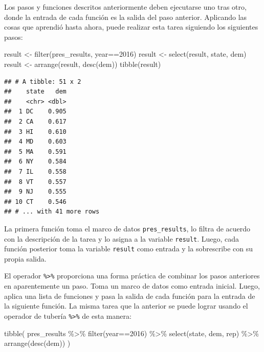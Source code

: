 \documentclass[
]{book}
\newenvironment{Shaded}{\begin{snugshade}}{\end{snugshade}}
\newcommand{\DecValTok}[1]{\textcolor[rgb]{0.00,0.00,0.81}{#1}}
\newcommand{\FunctionTok}[1]{\textcolor[rgb]{0.00,0.00,0.00}{#1}}
\newcommand{\NormalTok}[1]{#1}
\newcommand{\OtherTok}[1]{\textcolor[rgb]{0.56,0.35,0.01}{#1}}
\newcommand{\SpecialCharTok}[1]{\textcolor[rgb]{0.00,0.00,0.00}{#1}}
\begin{document}
Los pasos y funciones descritos anteriormente deben ejecutarse uno tras otro, donde la entrada de cada función es la salida del paso anterior. Aplicando las cosas que aprendió hasta ahora, puede realizar esta tarea siguiendo los siguientes pasos:

\begin{Shaded}
\begin{Highlighting}[]
\NormalTok{result }\OtherTok{\textless{}{-}} \FunctionTok{filter}\NormalTok{(pres\_results, year}\SpecialCharTok{==}\DecValTok{2016}\NormalTok{)}
\NormalTok{result }\OtherTok{\textless{}{-}} \FunctionTok{select}\NormalTok{(result, state, dem)}
\NormalTok{result }\OtherTok{\textless{}{-}} \FunctionTok{arrange}\NormalTok{(result, }\FunctionTok{desc}\NormalTok{(dem))}
\FunctionTok{tibble}\NormalTok{(result)}
\end{Highlighting}
\end{Shaded}

\begin{verbatim}
## # A tibble: 51 x 2
##    state   dem
##    <chr> <dbl>
##  1 DC    0.905
##  2 CA    0.617
##  3 HI    0.610
##  4 MD    0.603
##  5 MA    0.591
##  6 NY    0.584
##  7 IL    0.558
##  8 VT    0.557
##  9 NJ    0.555
## 10 CT    0.546
## # ... with 41 more rows
\end{verbatim}

La primera función toma el marco de datos \texttt{pres\_results}, lo filtra de acuerdo con la descripción de la tarea y lo asigna a la variable \texttt{result}. Luego, cada función posterior toma la variable \texttt{result} como entrada y la sobrescribe con su propia salida.

El operador \texttt{\%\textgreater{}\%} proporciona una forma práctica de combinar los pasos anteriores en aparentemente un paso. Toma un marco de datos como entrada inicial. Luego, aplica una lista de funciones y pasa la salida de cada función para la entrada de la siguiente función. La misma tarea que la anterior se puede lograr usando el operador de tubería \texttt{\%\textgreater{}\%} de esta manera:

\begin{Shaded}
\begin{Highlighting}[]
\FunctionTok{tibble}\NormalTok{(}
\NormalTok{pres\_results }\SpecialCharTok{\%\textgreater{}\%}
  \FunctionTok{filter}\NormalTok{(year}\SpecialCharTok{==}\DecValTok{2016}\NormalTok{) }\SpecialCharTok{\%\textgreater{}\%}
  \FunctionTok{select}\NormalTok{(state, dem, rep) }\SpecialCharTok{\%\textgreater{}\%}
  \FunctionTok{arrange}\NormalTok{(}\FunctionTok{desc}\NormalTok{(dem))}
\NormalTok{)}
\end{Highlighting}
\end{Shaded}
\end{document}
